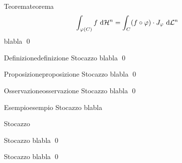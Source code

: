 \documentclass[intlimits]{amsart}
\begin{document}
\begin{theorem}{Teorema}{teorema}
    \[\int_{\varphi(C)} f \text{ d} \mathcal{H}^n = \int_{C} (f\circ \varphi) \cdot J_\varphi \text{ d} \mathcal{L}^n\]
    \proof
    blabla
    \qed
\end{theorem}

\begin{definition}{Definizione}{definizione}
    Stocazzo
    \proof
    blabla
    \qed
\end{definition}

\begin{proposition}{Proposizione}{proposizione}
    Stocazzo
    \proof
    blabla
    \qed
\end{proposition}

\begin{remark}{Osservazione}{osservazione}
    Stocazzo
    \proof 
    blabla
    \qed
\end{remark}

\begin{example}{Esempio}{esempio}
    Stocazzo
    \solution
    blabla
    \solved
\end{example}

\begin{notation}{}{}
    Stocazzo
\end{notation}

\begin{lemma}{}{}
    Stocazzo
    \proof
    blabla
    \qed
\end{lemma}

\begin{corollary}{}{}
    Stocazzo
    \proof 
    blabla
    \qed
\end{corollary}
\end{document}
